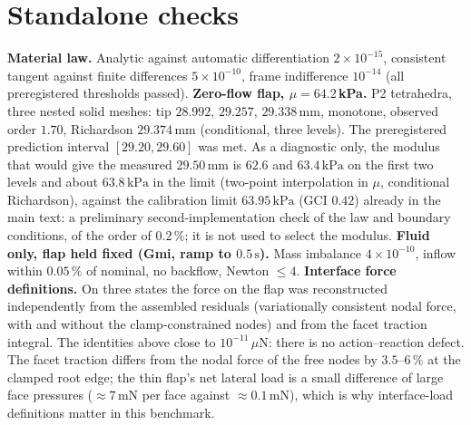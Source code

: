 \documentclass[sn-mathphys,Numbered]{sn-jnl}
\begin{document}
\section{Standalone checks}\label{sec:checks}
\textbf{Material law.} Analytic against automatic differentiation $2\times10^{-15}$, consistent tangent against finite differences $5\times10^{-10}$, frame indifference $10^{-14}$ (all preregistered thresholds passed).
\textbf{Zero-flow flap, $\mu=64.2$\,kPa.} P2 tetrahedra, three nested solid meshes: tip $28.992$, $29.257$, $29.338\,\mathrm{mm}$, monotone, observed order $1.70$, Richardson $29.374\,\mathrm{mm}$ (conditional, three levels). The preregistered prediction interval $[29.20,29.60]$ was met. As a diagnostic only, the modulus that would give the measured $29.50\,\mathrm{mm}$ is $62.6$ and $63.4\,\mathrm{kPa}$ on the first two levels and about $63.8\,\mathrm{kPa}$ in the limit (two-point interpolation in $\mu$, conditional Richardson), against the calibration limit $63.95\,\mathrm{kPa}$ (GCI $0.42$) already in the main text: a preliminary second-implementation check of the law and boundary conditions, of the order of $0.2\,\%$; it is not used to select the modulus.
\textbf{Fluid only, flap held fixed (Gmi, ramp to $0.5\,\mathrm{s}$).} Mass imbalance $4\times10^{-10}$, inflow within $0.05\,\%$ of nominal, no backflow, Newton $\le4$.
\textbf{Interface force definitions.} On three states the force on the flap was reconstructed independently from the assembled residuals (variationally consistent nodal force, with and without the clamp-constrained nodes) and from the facet traction integral. The identities above close to $10^{-11}\,\mu\mathrm N$: there is no action--reaction defect. The facet traction differs from the nodal force of the free nodes by $3.5$--$6\,\%$ at the clamped root edge; the thin flap's net lateral load is a small difference of large face pressures ($\approx7$\,mN per face against $\approx0.1$\,mN), which is why interface-load definitions matter in this benchmark.
\end{document}
